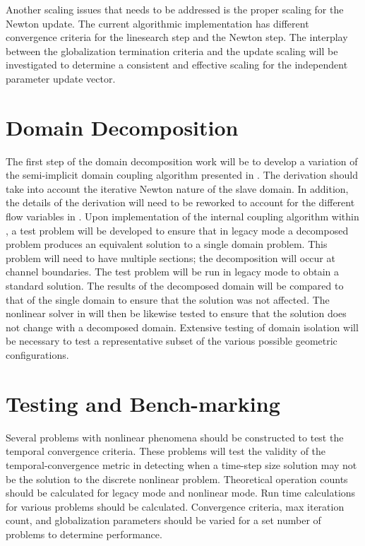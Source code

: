 Another scaling issues that needs to be addressed is the proper scaling for the Newton update.
The current algorithmic implementation has different convergence criteria for the linesearch step and the Newton step.
The interplay between the globalization termination criteria and the update scaling will be investigated to determine a consistent and effective scaling for the independent parameter update vector. 

\section{Domain Decomposition}
\label{sect:domain_coupling}
The first step of the domain decomposition work will be to develop a variation of the semi-implicit domain coupling algorithm presented in .
The derivation should take into account the iterative Newton nature of the slave domain. 
In addition, the details of the derivation will need to be reworked to account for the different flow variables in \cobra{}.
Upon implementation of the internal coupling algorithm within \cobra{}, a test problem will be developed to ensure that in legacy mode a decomposed problem produces an equivalent solution to a single domain problem.
This problem will need to have multiple sections; the decomposition will occur at channel boundaries.
The test problem will be run in legacy mode to obtain a standard solution.
The results of the decomposed domain will be compared to that of the single domain to ensure that the solution was not affected.
The nonlinear solver in \cobra{} will then be likewise tested to ensure that the solution does not change with a decomposed domain.
Extensive testing of domain isolation will be necessary to test a representative subset of the various possible geometric configurations.

\section{Testing and Bench-marking}
\label{sect:proposal_temporal_testing}
Several problems with nonlinear phenomena should be constructed to test the temporal convergence criteria.
These problems will test the validity of the temporal-convergence metric in detecting when a time-step size solution may not be the solution to the discrete nonlinear problem.
Theoretical operation counts should be calculated for legacy mode and nonlinear mode.
Run time calculations for various problems should be calculated.
Convergence criteria, max iteration count, and globalization parameters should be varied for a set number of problems to determine performance.

